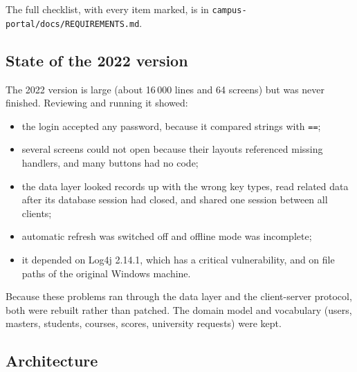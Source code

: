 \documentclass[11pt,a4paper]{article}
\begin{document}
The full checklist, with every item marked, is in \texttt{campus-portal/docs/REQUIREMENTS.md}.

\subsection{State of the 2022 version}

The 2022 version is large (about 16\,000 lines and 64 screens) but was never finished. Reviewing and running it showed:
\begin{itemize}
\item the login accepted any password, because it compared strings with \texttt{==};
\item several screens could not open because their layouts referenced missing handlers, and many buttons had no code;
\item the data layer looked records up with the wrong key types, read related data after its database session had closed, and shared one session between all clients;
\item automatic refresh was switched off and offline mode was incomplete;
\item it depended on Log4j 2.14.1, which has a critical vulnerability, and on file paths of the original Windows machine.
\end{itemize}
Because these problems ran through the data layer and the client-server protocol, both were rebuilt rather than patched. The domain model and vocabulary (users, masters, students, courses, scores, university requests) were kept.

\subsection{Architecture}
\end{document}

